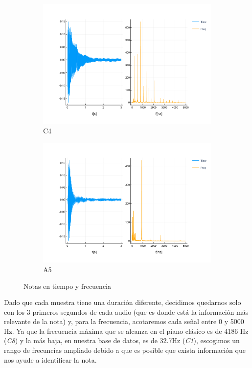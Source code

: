 \documentclass[12pt]{article}
\begin{document}
\begin{figure}[h!]
	\centering
	\begin{subfigure}{.5\textwidth}
		\centering
		\includegraphics[width=1.0\linewidth]{c4.pdf}
		\caption{C4}
		\label{fig:c4}
	\end{subfigure}%
	\begin{subfigure}{.5\textwidth}
		\centering
		\includegraphics[width=1.0\linewidth]{a5.pdf}
		\caption{A5}
		\label{fig:a5}
	\end{subfigure}
	\caption{Notas en tiempo y frecuencia}
\end{figure}

\bigskip
Dado que cada muestra tiene una duración diferente, decidimos quedarnos solo con los 3 primeros segundos de cada audio (que es donde está la información más
relevante de la nota) y, para la frecuencia, acotaremos cada señal entre 0 y 5000 Hz. Ya que la frecuencia máxima que se alcanza en el 
piano clásico es de 4186 Hz (\textit{C8}) y la más baja, en nuestra base de datos, es de 32.7Hz (\textit{C1}), escogimos un rango
de frecuncias ampliado debido a que es posible que exista información que nos ayude a identificar la nota.
\end{document}
